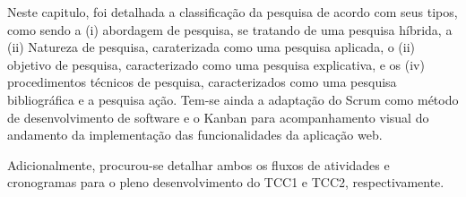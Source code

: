 Neste capitulo, foi detalhada a classificação da pesquisa de acordo com seus tipos, como sendo a (i) abordagem de pesquisa, se tratando de uma pesquisa híbrida, a (ii) Natureza de pesquisa, caraterizada como uma pesquisa aplicada, o (ii) objetivo de pesquisa, caracterizado como uma pesquisa explicativa, e os (iv) procedimentos técnicos de pesquisa, caracterizados como uma pesquisa bibliográfica e a pesquisa ação. Tem-se ainda a adaptação do Scrum como método de desenvolvimento de software e o Kanban para acompanhamento visual do andamento da implementação das funcionalidades da aplicação web.

Adicionalmente, procurou-se detalhar ambos os fluxos de atividades e cronogramas para o pleno desenvolvimento do TCC1 e TCC2, respectivamente.

